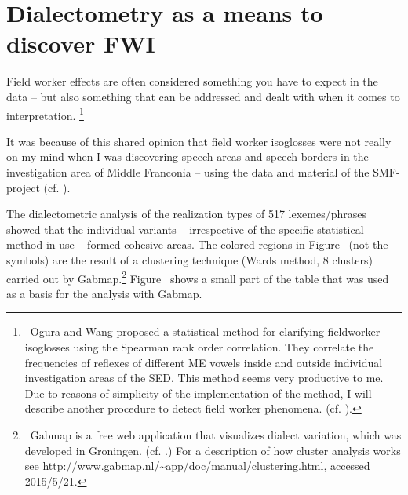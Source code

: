 \documentclass[output=paper]{LSP/langsci}
\begin{document}
\section{Dialectometry as a means to discover FWI}
Field worker effects are often considered something you have to expect in the data – but also something that can be addressed and dealt with when it comes to interpretation.
\footnote{\ Ogura and Wang proposed a statistical {\textquotedbl}method for clarifying fieldworker isoglosses{\textquotedbl} using the Spearman rank order correlation. They correlate the frequencies of reflexes of different ME vowels inside and outside individual investigation areas of the SED. This method seems very productive to me. Due to reasons of simplicity of the implementation of the method, I will describe another procedure to detect field worker phenomena. (cf. \citealt{ogura_isoglosses_1992}).}

It was because of this shared opinion that field worker isoglosses were not really on my mind when I was discovering speech areas and speech borders in the investigation area of Middle Franconia – using the data and material of the SMF-project (cf. \citealt{mathussek_sprachraume_2014}).

The dialectometric analysis of the realization types of 517 lexemes/phrases showed that the individual variants – irrespective of the specific statistical method in use – formed cohesive areas. The colored regions in Figure~ (not the symbols) are the result of a clustering technique (Ward{\textquotesingle}s method, 8 clusters) carried out by Gabmap.\footnote{\ Gabmap is a free {\textquotedbl}web application that visualizes dialect variation{\textquotedbl}, which was developed in Groningen. (cf. \citealt{nerbonne_gabmap_2011}.) For a description of how cluster analysis works see \url{http://www.gabmap.nl/\~app/doc/manual/clustering.html}, accessed 2015/5/21.} Figure~ shows a small part of the table that was used as a basis for the analysis with Gabmap.
\end{document}
